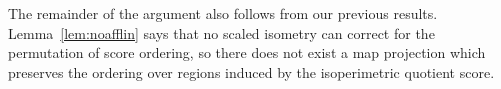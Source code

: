 The remainder of the argument also follows from our previous results.  Lemma~\ref{lem:noafflin} says that no scaled isometry can correct for the permutation of score ordering, so there does not exist a map projection which preserves the ordering over regions induced by the isoperimetric quotient score.






